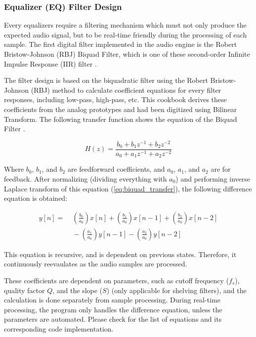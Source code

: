 \subsubsection{Equalizer (EQ) Filter Design}
\label{sec:eq_filter}

Every equalizers require a filtering mechanism which must not only produce the expected audio signal,
but to be real-time friendly during the processing of each sample. The first digital 
filter implemented in the audio engine is the Robert Bristow-Johnson (RBJ) Biquad Filter, which is one of these second-order 
Infinite Impulse Response (IIR) filter \cite{smith_biquad}. 

The filter design is based on the biquadratic filter \cite{vanWaterschootT.2007APPT} 
using the Robert Bristow-Johnson (RBJ) method \cite{cookbook} to calculate
coefficient equations for every filter responses, including low-pass, high-pass, etc. This cookbook derives these
coefficients from the analog prototypes and had been digitized using Bilinear Transform. The following transfer
function shows the equation of the Biquad Filter \cite{cookbook}.

\begin{equation}\label{eq:biquad_transfer}
    H(z) = \frac{b_0 + b_1 z^{-1} + b_2 z^{-2}}{a_0 + a_1 z^{-1} + a_2 z^{-2}}
\end{equation}

Where $b_0$, $b_1$, and $b_2$ are feedforward coefficients, and $a_0$, $a_1$, and $a_2$ are for feedback. After normalizing
(dividing everything with $a_0$) and performing inverse Laplace transform of this equation (\ref{eq:biquad_transfer}), the
following difference equation is obtained:

\begin{equation}\label{eq:biquad_diff_eqn}
\begin{split}
    y[n] = &\;\left(\frac{b_0}{a_0}\right) x[n] + \left(\frac{b_1}{a_0}\right) x[n-1] + \left(\frac{b_2}{a_0}\right) x[n-2] \\
          &\; - \left(\frac{a_1}{a_0}\right) y[n-1] - \left(\frac{a_2}{a_0}\right) y[n-2]
\end{split}
\end{equation}

This equation is recursive, and is dependent on previous states. Therefore, it continuously reevaulates as the 
audio samples are processed.

These coefficients are dependent on parameters, such as cutoff frequency ($f_s$), quality factor $Q$, 
and the slope ($S$) (only applicable for shelving filters), and the calculation is done separately from sample
processing. During real-time processing, the program only handles the difference equation, unless the parameters
are automated. Please check  for the list of equations and its corresponding code implementation.

